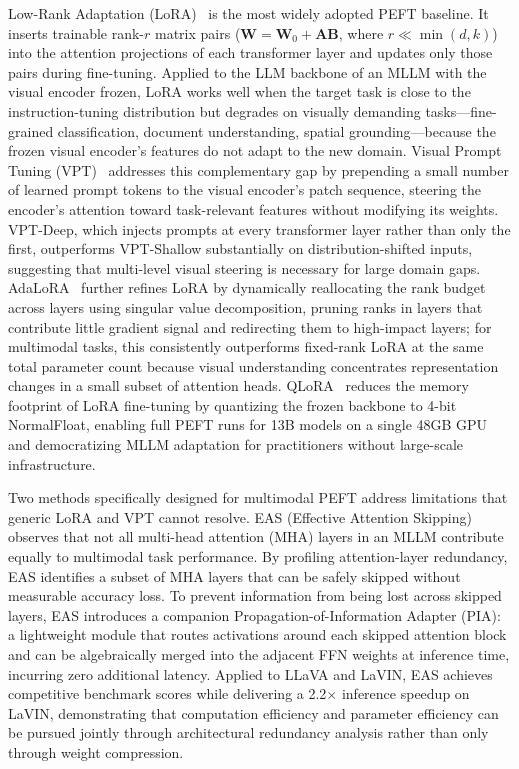 Low-Rank Adaptation (LoRA)~\cite{Hu202106865} is the most widely adopted PEFT baseline. It inserts trainable rank-$r$ matrix pairs ($\mathbf{W} = \mathbf{W}_0 + \mathbf{A}\mathbf{B}$, where $r \ll \min(d, k)$) into the attention projections of each transformer layer and updates only those pairs during fine-tuning. Applied to the LLM backbone of an MLLM with the visual encoder frozen, LoRA works well when the target task is close to the instruction-tuning distribution but degrades on visually demanding tasks---fine-grained classification, document understanding, spatial grounding---because the frozen visual encoder's features do not adapt to the new domain. Visual Prompt Tuning (VPT)~\cite{Jia202201986} addresses this complementary gap by prepending a small number of learned prompt tokens to the visual encoder's patch sequence, steering the encoder's attention toward task-relevant features without modifying its weights. VPT-Deep, which injects prompts at every transformer layer rather than only the first, outperforms VPT-Shallow substantially on distribution-shifted inputs, suggesting that multi-level visual steering is necessary for large domain gaps. AdaLoRA~\cite{Zhang202203985} further refines LoRA by dynamically reallocating the rank budget across layers using singular value decomposition, pruning ranks in layers that contribute little gradient signal and redirecting them to high-impact layers; for multimodal tasks, this consistently outperforms fixed-rank LoRA at the same total parameter count because visual understanding concentrates representation changes in a small subset of attention heads. QLoRA~\cite{Dettmers202305441} reduces the memory footprint of LoRA fine-tuning by quantizing the frozen backbone to 4-bit NormalFloat, enabling full PEFT runs for 13B models on a single 48GB GPU and democratizing MLLM adaptation for practitioners without large-scale infrastructure.

Two methods specifically designed for multimodal PEFT address limitations that generic LoRA and VPT cannot resolve. EAS (Effective Attention Skipping)~\cite{Wu202415226} observes that not all multi-head attention (MHA) layers in an MLLM contribute equally to multimodal task performance. By profiling attention-layer redundancy, EAS identifies a subset of MHA layers that can be safely skipped without measurable accuracy loss. To prevent information from being lost across skipped layers, EAS introduces a companion Propagation-of-Information Adapter (PIA): a lightweight module that routes activations around each skipped attention block and can be algebraically merged into the adjacent FFN weights at inference time, incurring zero additional latency. Applied to LLaVA and LaVIN, EAS achieves competitive benchmark scores while delivering a 2.2$\times$ inference speedup on LaVIN, demonstrating that computation efficiency and parameter efficiency can be pursued jointly through architectural redundancy analysis rather than only through weight compression.

